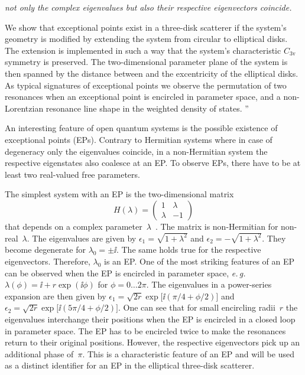 \begin{description}
\emph{not only the complex eigenvalues but also their respective eigenvectors
coincide.}

We show that exceptional points exist in a three-disk scatterer if
the system's geometry is modified by extending the system from circular to
elliptical disks. The extension is implemented in such a way that the
system's characteristic $C_{3\mathrm{v}}$ symmetry is preserved. The
two-dimensional parameter plane of the system is then spanned by the distance
between and the excentricity of the elliptical disks. As typical signatures
of exceptional points we observe the permutation of two resonances when an
exceptional point is encircled in parameter space, and a non-Lorentzian
resonance line shape in the weighted density of states.
''

An interesting feature of open quantum systems is the possible existence of
exceptional points (EPs).
Contrary  to  Hermitian  systems where in case of degeneracy only the
eigenvalues coincide, in a non-Hermitian system the respective eigenstates
also coalesce at an EP.
To observe EPs,  there have to be at least two real-valued free parameters.

The simplest system with an EP is the two-dimensional matrix
\begin{equation}
  H(\lambda) = \begin{pmatrix}
    1 & \lambda\\
    \lambda & -1
  \end{pmatrix}
\end{equation}
that depends on a complex parameter~$\lambda$~\cite{Kato80}. The matrix is
non-Hermitian for non-real~$\lambda$. The eigenvalues are given by
$\epsilon_1 = \sqrt{1+\lambda^2}$ and $\epsilon_2 = -\sqrt{1+\lambda^2}$.
They become degenerate for $\lambda_0 = {\pm \ii}$. The same holds true for
the respective eigenvectors. Therefore, $\lambda_0$ is an EP. One of the most
striking features of an EP can be observed when the EP is encircled in
parameter space, \emph{e.\,g.} $\lambda(\phi) = \ii + r \exp(\ii\phi)$ for
$\phi = 0 \dots 2\pi$. The eigenvalues in a power-series expansion are then
given by $\epsilon_1 = \sqrt{2r} \exp\bigl[\ii (\pi/4 + \phi/2)\bigr]$ and
$\epsilon_2 = \sqrt{2r} \exp\bigl[\ii (5\pi/4 + \phi/2)\bigr]$. One can see
that for small encircling radii~$r$ the eigenvalues interchange their
positions when the EP is encircled in a closed loop in parameter space. The
EP has to be encircled twice to make the resonances return to their original
positions. However, the respective eigenvectors pick up an additional phase
of~$\pi$. This is a characteristic feature of an EP and will be used as a
distinct identifier for an EP in the elliptical three-disk scatterer.


\end{description}
